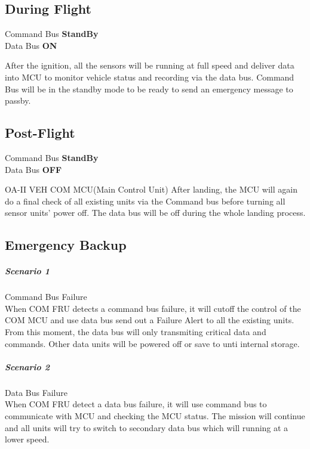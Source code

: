 \documentclass[12pt,article]{memoir}
\begin{document}
\subsection{During Flight}
\begin{center}
Command Bus \textbf{StandBy}\\
Data Bus \textbf{ON}
\end{center}
After the ignition, all the sensors will be running at full speed and deliver data into MCU to monitor vehicle status and recording via the data bus. Command Bus will be in the standby mode to be ready to send an emergency message to passby.
\subsection{Post-Flight}
\begin{center}
Command Bus \textbf{StandBy}\\
Data Bus \textbf{OFF}
\end{center}OA-II VEH COM MCU(Main Control Unit)
After landing, the MCU will again do a final check of all existing units via the Command bus before turning all sensor units' power off. The data bus will be off during the whole landing process.
\subsection{Emergency Backup}
\subparagraph{Scenario 1}Command Bus Failure \\
When COM FRU detects a command bus failure, it will cutoff the control of the COM MCU and use data bus send out a Failure Alert to all the existing units. From this moment, the data bus will only transmiting critical data and commands. Other data units will be powered off or save to unti internal storage.
\subparagraph{Scenario 2 }Data Bus Failure \\
When COM FRU detect a data bus failure, it will use command bus to communicate with MCU and checking the MCU status. The mission will continue and all units will try to switch to secondary data bus which will running at a lower speed. 
\end{document}

